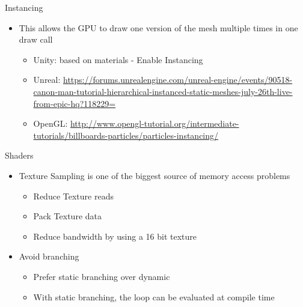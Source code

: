 \begin{frame}{Instancing}
	\begin{itemize}
		\pause \item This allows the GPU to draw one version of the mesh multiple times in one draw call
		\begin{itemize}
			\pause \item Unity: based on materials - Enable Instancing
			\pause \item Unreal: \url{https://forums.unrealengine.com/unreal-engine/events/90518-canon-man-tutorial-hierarchical-instanced-static-meshes-july-26th-live-from-epic-hq?118229=}  
			\pause \item OpenGL: \url{http://www.opengl-tutorial.org/intermediate-tutorials/billboards-particles/particles-instancing/}
		\end{itemize}
	\end{itemize}
\end{frame}

\begin{frame}{Shaders}
	\begin{itemize}
		\pause \item Texture Sampling is one of the biggest source of memory access problems
			\begin{itemize}
				\pause \item Reduce Texture reads
				\pause \item Pack Texture data
				\pause \item Reduce bandwidth by using a 16 bit texture
			\end{itemize}
		\pause \item Avoid branching
			\begin{itemize}
				\pause \item Prefer static branching over dynamic
				\pause \item With static branching, the loop can be evaluated at compile time 
			\end{itemize}
	\end{itemize}
\end{frame}